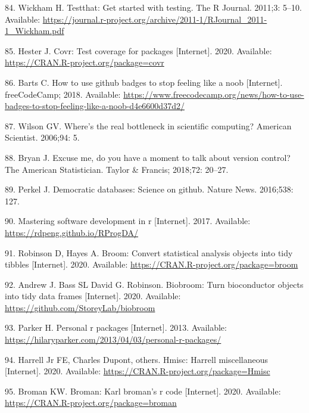 \documentclass[10pt,letterpaper]{article}
\begin{document}
\leavevmode\hypertarget{ref-testthat}{}%
84. Wickham H. Testthat: Get started with testing. The R Journal.
2011;3: 5--10. Available:
\url{https://journal.r-project.org/archive/2011-1/RJournal_2011-1_Wickham.pdf}

\leavevmode\hypertarget{ref-covr}{}%
85. Hester J. Covr: Test coverage for packages {[}Internet{]}. 2020.
Available: \url{https://CRAN.R-project.org/package=covr}

\leavevmode\hypertarget{ref-barts2018}{}%
86. Barts C. How to use github badges to stop feeling like a noob
{[}Internet{]}. freeCodeCamp; 2018. Available:
\url{https://www.freecodecamp.org/news/how-to-use-badges-to-stop-feeling-like-a-noob-d4e6600d37d2/}

\leavevmode\hypertarget{ref-wilson2006}{}%
87. Wilson GV. Where's the real bottleneck in scientific computing?
American Scientist. 2006;94: 5.

\leavevmode\hypertarget{ref-bryan2018}{}%
88. Bryan J. Excuse me, do you have a moment to talk about version
control? The American Statistician. Taylor \& Francis; 2018;72: 20--27.

\leavevmode\hypertarget{ref-perkel2016}{}%
89. Perkel J. Democratic databases: Science on github. Nature News.
2016;538: 127.

\leavevmode\hypertarget{ref-peng2017}{}%
90. Mastering software development in r {[}Internet{]}. 2017. Available:
\url{https://rdpeng.github.io/RProgDA/}

\leavevmode\hypertarget{ref-broom}{}%
91. Robinson D, Hayes A. Broom: Convert statistical analysis objects
into tidy tibbles {[}Internet{]}. 2020. Available:
\url{https://CRAN.R-project.org/package=broom}

\leavevmode\hypertarget{ref-biobroom}{}%
92. Andrew J. Bass SL David G. Robinson. Biobroom: Turn bioconductor
objects into tidy data frames {[}Internet{]}. 2020. Available:
\url{https://github.com/StoreyLab/biobroom}

\leavevmode\hypertarget{ref-parker2013}{}%
93. Parker H. Personal r packages {[}Internet{]}. 2013. Available:
\url{https://hilaryparker.com/2013/04/03/personal-r-packages/}

\leavevmode\hypertarget{ref-Hmisc}{}%
94. Harrell Jr FE, Charles Dupont, others. Hmisc: Harrell miscellaneous
{[}Internet{]}. 2020. Available:
\url{https://CRAN.R-project.org/package=Hmisc}

\leavevmode\hypertarget{ref-broman}{}%
95. Broman KW. Broman: Karl broman's r code {[}Internet{]}. 2020.
Available: \url{https://CRAN.R-project.org/package=broman}
\end{document}
